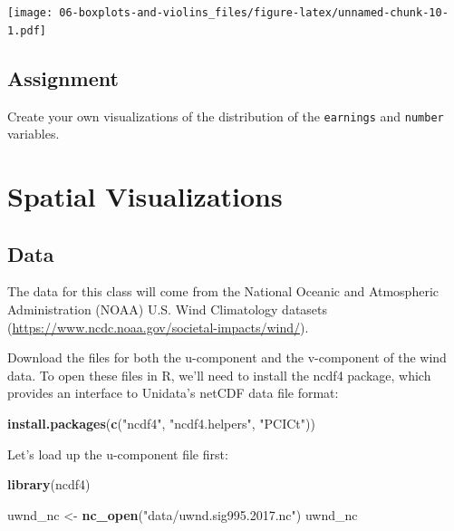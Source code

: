 \documentclass[]{book}
\newenvironment{Shaded}{\begin{snugshade}}{\end{snugshade}}
\newcommand{\KeywordTok}[1]{\textcolor[rgb]{0.13,0.29,0.53}{\textbf{{#1}}}}
\newcommand{\StringTok}[1]{\textcolor[rgb]{0.31,0.60,0.02}{{#1}}}
\newcommand{\NormalTok}[1]{{#1}}
\theoremstyle{definition}
\theoremstyle{definition}
\theoremstyle{remark}
\begin{document}
\texttt{[image: 06-boxplots-and-violins\_files/figure-latex/unnamed-chunk-10-1.pdf]}

\section{Assignment}\label{assignment-5}

Create your own visualizations of the distribution of the
\texttt{earnings} and \texttt{number} variables.

\hypertarget{geom_spoke}{\chapter{Spatial
Visualizations}\label{geom_spoke}}

\section{Data}\label{data-4}

The data for this class will come from the National Oceanic and
Atmospheric Administration (NOAA) U.S. Wind Climatology datasets
(\url{https://www.ncdc.noaa.gov/societal-impacts/wind/}).

Download the files for both the u-component and the v-component of the
wind data. To open these files in R, we'll need to install the ncdf4
package, which provides an interface to Unidata's netCDF data file
format:

\begin{Shaded}
\begin{Highlighting}[]
\KeywordTok{install.packages}\NormalTok{(}\KeywordTok{c}\NormalTok{(}\StringTok{"ncdf4"}\NormalTok{, }\StringTok{"ncdf4.helpers"}\NormalTok{, }\StringTok{"PCICt"}\NormalTok{))}
\end{Highlighting}
\end{Shaded}

Let's load up the u-component file first:

\begin{Shaded}
\begin{Highlighting}[]
\KeywordTok{library}\NormalTok{(ncdf4)}

\NormalTok{uwnd_nc <-}\StringTok{ }\KeywordTok{nc_open}\NormalTok{(}\StringTok{"data/uwnd.sig995.2017.nc"}\NormalTok{)}
\NormalTok{uwnd_nc}
\end{Highlighting}
\end{Shaded}
\end{document}
